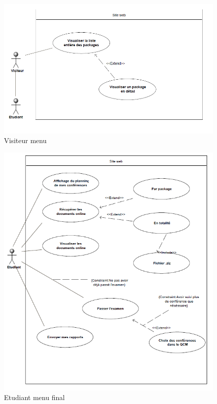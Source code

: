     \begin{figure}[h]
        \begin{center}
            \includegraphics[scale=0.70]{images/uml/visiteurMenu.png} 
        \end{center}

        \caption{Visiteur menu}
        \label{Visiteur menu}
    \end{figure}

    \begin{figure}[h]
        \begin{center}
            \includegraphics[scale= 0.70]{images/uml/etudiantMenuFinal.png} 
        \end{center}

        \caption{Etudiant menu final}
        \label{Etudiant menu final}
    \end{figure}

